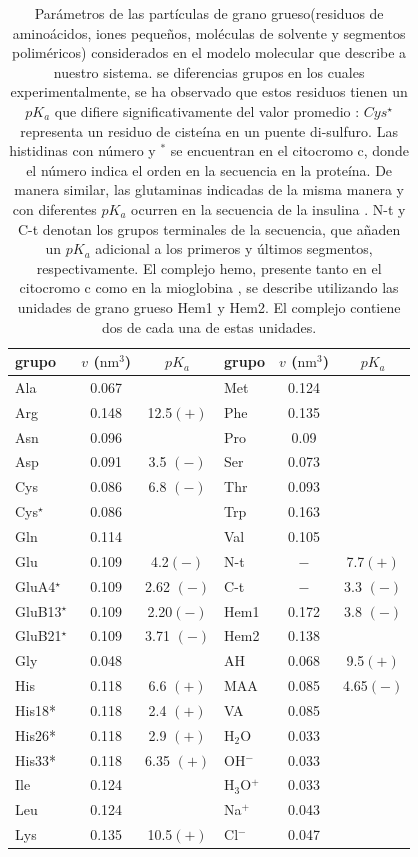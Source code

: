 \begin{table}[htb!]
	\centering
	\small
	\begin{tabular}{|lcc|lcc|}
		\hline
		grupo& $v$ ($\text{nm}^3$)& $pK_a$&  grupo& $v$ ($\text{nm}^3$)& $pK_a$\\
		\hline
		Ala & 0.067 & & Met& 0.124& \\
		Arg & 0.148 & 12.5$ (+)$& Phe& 0.135& \\
		Asn & 0.096 & & Pro& 0.09& \\
		Asp & 0.091 & 3.5 $(-)$& Ser& 0.073& \\
		Cys & 0.086 & 6.8 $(-)$& Thr& 0.093& \\
		Cys$^\star$ & 0.086 & & Trp& 0.163& \\
		Gln & 0.114 & & Val& 0.105& \\
		Glu & 0.109 & 4.2$ (-)$& N-t& ${-}$& 7.7$ (+)$\\
		GluA4$^\star$ & 0.109 & 2.62 $(-)$& C-t& ${-}$& 3.3 $(-)$\\
		GluB13$^\star$ & 0.109 & 2.20$ (-)$& Hem1& 0.172& 3.8 $(-)$\\ 
		GluB21$^\star$ & 0.109 & 3.71 $(-)$& Hem2& 0.138& \\
		Gly & 0.048 & & AH& 0.068& 9.5$(+)$\\
		His & 0.118 & 6.6 $(+)$& MAA& 0.085& 4.65$(-)$\\ 
		His18* & 0.118 & 2.4 $(+)$& VA& 0.085& \\
		His26* & 0.118 & 2.9 $(+)$& H$_2$O& 0.033& \\
		His33*& 0.118& 6.35 $(+)$& OH$^-$& 0.033&\\
		Ile& 0.124& & H$_3$O$^+$& 0.033&\\
		Leu& 0.124& & Na$^+$& 0.043&\\
		Lys& 0.135& 10.5$ (+)$& Cl$^-$& 0.047&\\
		\hline
	\end{tabular}
	\caption{Par\'ametros de las part\'iculas de  grano grueso(residuos de amino\'acidos, iones peque\~nos, mol\'eculas de solvente y segmentos polim\'ericos) considerados en el modelo molecular que describe a nuestro sistema.  se diferencias grupos en los cuales experimentalmente, se ha observado que estos residuos tienen un $pK_a$ que difiere significativamente del valor promedio \cite{grimsley2009summary}:  $Cys^\star$ representa un residuo de ciste\'ina en un puente di-sulfuro. Las histidinas con  n\'umero y  $^\ast$ se encuentran en el citocromo c, donde el n\'umero indica el orden en la secuencia en la prote\'ina. De manera similar, las glutaminas indicadas de la misma manera y con diferentes $pK_a$ ocurren en la secuencia de la insulina \cite{grimsley2009summary}. N-t y C-t denotan los grupos terminales de la secuencia, que a\~naden un $pK_a$ adicional a los primeros y \'ultimos segmentos, respectivamente. El complejo hemo, presente tanto en el citocromo c como en la mioglobina \cite{mirkin2008high,hubbard1990x}, se describe utilizando las unidades de grano grueso Hem1 y Hem2. El complejo contiene dos de cada una de estas unidades.}
	\label{table:Coarse-grain} 
\end{table}



